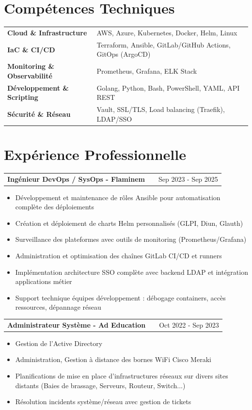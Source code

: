 \documentclass[a4paper,11pt]{article}
\makeatletter
\newenvironment{joblong}[2]
    {
    \begin{tabularx}{\linewidth}{@{}l X r@{}}
    \textbf{#1} & \hfill &  #2 \\[3.75pt]
    \end{tabularx}
    \begin{minipage}[t]{\linewidth}
    \begin{itemize}[nosep,after=\strut, leftmargin=1em, itemsep=3pt,label=--]
    }
    {
    \end{itemize}
    \end{minipage}    
    }
\makeatother
\begin{document}
\section{Compétences Techniques}
\begin{tabularx}{\linewidth}{@{}l X@{}}
\textbf{Cloud \& Infrastructure} & AWS, Azure, Kubernetes, Docker, Helm, Linux \\[3pt]
\textbf{IaC \& CI/CD} & Terraform, Ansible, GitLab/GitHub Actions, GitOps (ArgoCD) \\[3pt]
\textbf{Monitoring \& Observabilité} & Prometheus, Grafana, ELK Stack \\[3pt]
\textbf{Développement \& Scripting} & Golang, Python, Bash, PowerShell, YAML, API REST \\[3pt]
\textbf{Sécurité \& Réseau} & Vault, SSL/TLS, Load balancing (Traefik), LDAP/SSO \\[3pt]
\end{tabularx}

\section{Expérience Professionnelle}

\begin{joblong}{Ingénieur DevOps / SysOps - Flaminem}{Sep 2023 - Sep 2025}
\item Développement et maintenance de rôles Ansible pour automatisation complète des déploiements
\item Création et déploiement de charts Helm personnalisés (GLPI, Diun, Glauth)
\item Surveillance des plateformes avec outils de monitoring (Prometheus/Grafana)
\item Administration et optimisation des chaînes GitLab CI/CD et runners
\item Implémentation architecture SSO complète avec backend LDAP et intégration applications métier
\item Support technique équipes développement : débogage containers, accès ressources, dépannage réseau
\end{joblong}

\begin{joblong}{Administrateur Système - Ad Education}{Oct 2022 - Sep 2023}
\item Gestion de l'Active Directory
\item Administration, Gestion à distance des bornes WiFi Cisco Meraki
\item Planifications de mise en place d'infrastructures réseaux sur divers sites distants (Baies de brassage, Serveurs, Routeur, Switch...)
\item Résolution incidents système/réseau avec gestion de tickets
\end{joblong}
  
\end{document}
